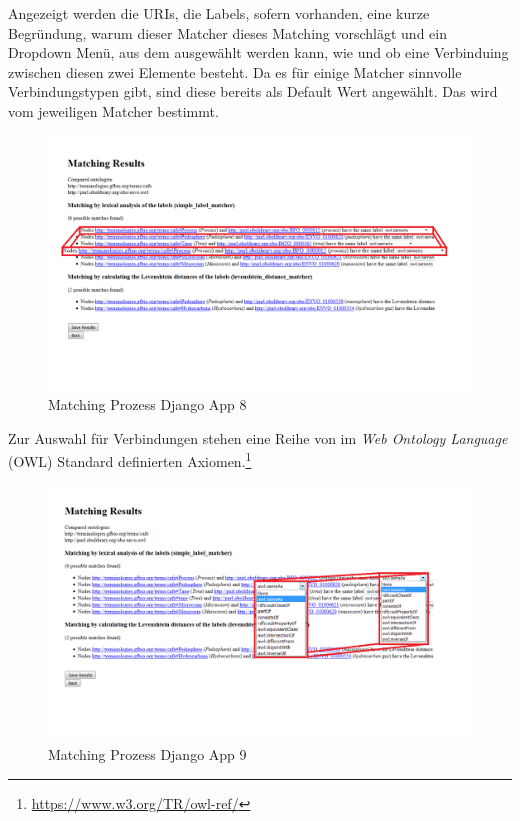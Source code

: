 		\pagebreak[4]
		Angezeigt werden die URIs, die Labels, sofern vorhanden, eine kurze
		Begründung, warum dieser Matcher dieses Matching vorschlägt und ein Dropdown
		Menü, aus dem ausgewählt werden kann, wie und ob eine Verbinduing zwischen
		diesen zwei Elemente besteht. Da es für einige Matcher sinnvolle
		Verbindungstypen gibt, sind diese bereits als Default Wert angewählt. Das
		wird vom jeweiligen Matcher bestimmt.
		\begin{figure}[h!]
		\centering
		\includegraphics[width=1.0\textwidth]{pics/SimpleOntologyMatcher-Process7.png}
		\caption{Matching Prozess Django App 8}
		\label{fig11}
		\end{figure}
		
		\pagebreak[4]
		Zur Auswahl für Verbindungen stehen eine Reihe von im \textit{Web Ontology
		Language} (OWL) Standard definierten
		Axiomen.\footnote{\url{https://www.w3.org/TR/owl-ref/}}
		\begin{figure}[h!]
		\centering
		\includegraphics[width=1.0\textwidth]{pics/SimpleOntologyMatcher-Process9.png}
		\caption{Matching Prozess Django App 9}
		\label{fig12}
		\end{figure}
		
